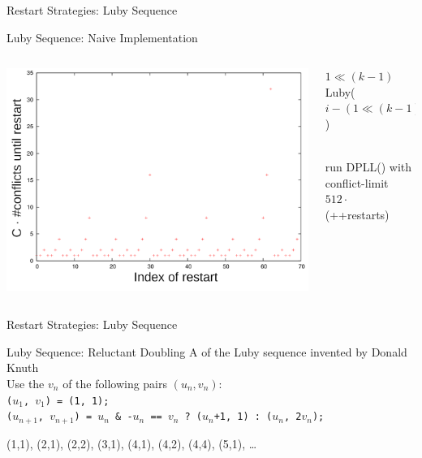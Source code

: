 \documentclass[t]{sdqbeamer}
\begin{document}
\begin{frame}{Restart Strategies: Luby Sequence}
\begin{block}{Luby Sequence: Naive Implementation}
	\begin{columns}[T]
	\begin{column}{0.45\textwidth}
		\centering
		\includegraphics[width=\textwidth]{figures/l04/restart-luby-legend}
	\end{column}
	\begin{column}{0.5\textwidth}
	\begin{algorithm}[H]
		\DontPrintSemicolon
		\caption{Luby Sequence}
		\BlankLine
		 {
			 {
				\Return $1 \ll (k-1)$
			}
		}
		 {
			 {
				\Return Luby($i - (1 \ll (k-1)) + 1$)
			}
		}
	\end{algorithm}~\\[1ex]
	run DPLL() with conflict-limit $512 \cdot$ (++restarts)
	\end{column}
	\end{columns}
\end{block}
\end{frame}
		
\begin{frame}{Restart Strategies: Luby Sequence}
\begin{block}{Luby Sequence: Reluctant Doubling}
A  of the Luby sequence invented by Donald Knuth\\[1ex]
Use the $v_n$ of the following pairs $(u_n, v_n)$:\\[1ex]
\texttt{($u_1$, $v_1$) = (1, 1);}\\
\texttt{($u_{n+1}$, $v_{n+1}$) = $u_n$ \& -$u_n$ == $v_n$\ ?\ ($u_n$+1, 1) :\ ($u_n$, 2$v_n$);}
\end{block}
\begin{example}
(1,1), (2,1), (2,2), (3,1), (4,1), (4,2), (4,4), (5,1), \ldots
\end{example}
\end{frame}
\end{document}
